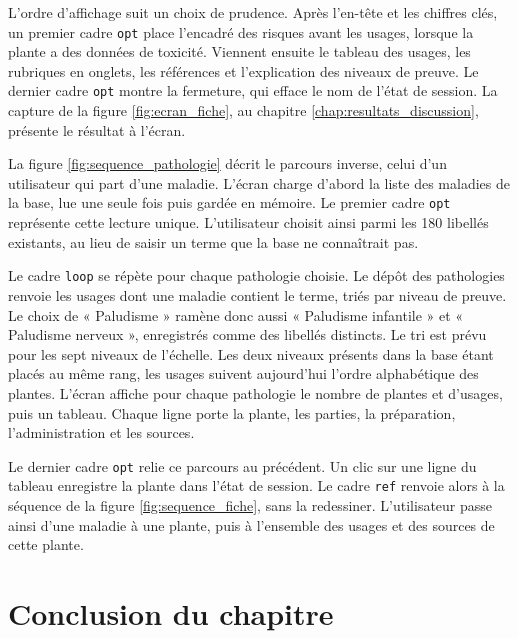 L'ordre d'affichage suit un choix de prudence. Après l'en-tête et les chiffres clés, un premier cadre \texttt{opt} place l'encadré des risques avant les usages, lorsque la plante a des données de toxicité. Viennent ensuite le tableau des usages, les rubriques en onglets, les références et l'explication des niveaux de preuve. Le dernier cadre \texttt{opt} montre la fermeture, qui efface le nom de l'état de session. La capture de la figure \ref{fig:ecran_fiche}, au chapitre \ref{chap:resultats_discussion}, présente le résultat à l'écran.

La figure \ref{fig:sequence_pathologie} décrit le parcours inverse, celui d'un utilisateur qui part d'une maladie. L'écran charge d'abord la liste des maladies de la base, lue une seule fois puis gardée en mémoire. Le premier cadre \texttt{opt} représente cette lecture unique. L'utilisateur choisit ainsi parmi les 180 libellés existants, au lieu de saisir un terme que la base ne connaîtrait pas.

Le cadre \texttt{loop} se répète pour chaque pathologie choisie. Le dépôt des pathologies renvoie les usages dont une maladie contient le terme, triés par niveau de preuve. Le choix de « Paludisme » ramène donc aussi « Paludisme infantile » et « Paludisme nerveux », enregistrés comme des libellés distincts. Le tri est prévu pour les sept niveaux de l'échelle. Les deux niveaux présents dans la base étant placés au même rang, les usages suivent aujourd'hui l'ordre alphabétique des plantes. L'écran affiche pour chaque pathologie le nombre de plantes et d'usages, puis un tableau. Chaque ligne porte la plante, les parties, la préparation, l'administration et les sources.

Le dernier cadre \texttt{opt} relie ce parcours au précédent. Un clic sur une ligne du tableau enregistre la plante dans l'état de session. Le cadre \texttt{ref} renvoie alors à la séquence de la figure \ref{fig:sequence_fiche}, sans la redessiner. L'utilisateur passe ainsi d'une maladie à une plante, puis à l'ensemble des usages et des sources de cette plante.


\section*{Conclusion du chapitre}

